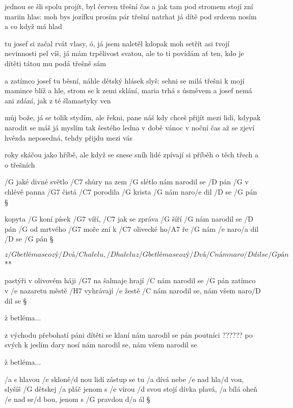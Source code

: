 jednou se šli spolu projít, byl červen třešní čas
a jak tam pod stromem stojí zní mariin hlas:
moh bys jozífku prosím pár třešní natrhat
já dítě pod srdcem nosím a co když má hlad \s

tu josef si začal rvát vlasy, ó, já jsem naletěl
kdopak moh setřít asi tvojí nevinnosti pel
víš, já mám trpělivost svatou, ale to ti povídám
ať ten, kdo je dítěti tátou mu podá třešně sám \s

a zatímco josef tu běsní, náhle dětský hlásek slyš:
sehni se milá třešni k mojí mamince blíž
a hle, strom se k zemi sklání, maria trhá s úsměvem
a josef nemá ani zdání, jak z té šlamastyky ven \s

můj bože, já se tolik stydím, ale řekni, pane náš
kdy chceš přijít mezi lidi, kdypak narodit se máš
já myslím tak šestého ledna v době vánoc v noční čas
až se zjeví hvězda neposedná, tehdy přijdu mezi vás \s

roky skáčou jako hříbě, ale když se snese sníh
lidé zpívají si příběh o těch třech a o třešních




/G jaké divné světlo /C7 shůry na zem /G slétlo
nám narodil se /D pán
/G v chlévě panna /G7 čistá /C7 porodila /G krista
/G nám naro/e dil /D se /G pán \S

kopyta /G koní písek /G7 víří, /C7 jak se zpráva /G šíří
/G nám narodil se /D pán
/G od mrtvého /G7 moře zní k /C7 olivecké ho/A7 ře
/G nám /e naro/a dil /D se /G pán \S

\R \[ z /G betléma se ozý/D vá /C halelu, /D halelu
   z /G betléma se ozý/D vá /C nám naro/D dil se /G pán \] **

pastýři v olivovém háji /G7 na šalmaje hrají
/C nám narodil se /G pán
zatímco v /e nazaretu městě /H7 vyhrávají /e žestě
/C nám narodil se, nám všem naro/D dil se \S

\r z betléma...

z východu přebohatí páni dítěti se klaní
nám narodil se pán
poutníci  ??????  po svých k jeslím dary nosí
nám narodil se, nám všem narodil se \s

\r z betléma...




/a s hlavou /e skloně/d nou lidí zástup se tu /a dívá
nebe /e nad hla/d vou, slyšíš /G dětskej /a pláč
jenom s /e vírou /d svou stojí dívka plavá, /a bílá
oheň /e nad se/d bou, jenom s /G pravdou d/a ál \S


